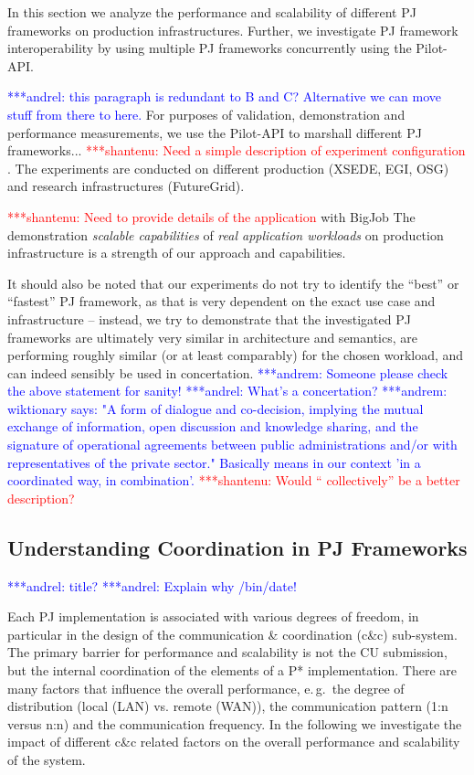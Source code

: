 \documentclass[conference,final]{IEEEtran}
\newcommand{\jhanote}[1]{ {\textcolor{red} { ***shantenu: #1 }}}
\newcommand{\alnote}[1]{ {\textcolor{blue} { ***andrel: #1 }}}
\newcommand{\amnote}[1]{ {\textcolor{blue} { ***andrem: #1 }}}
\newcommand{\alnote}[1]{}
\newcommand{\amnote}[1]{}
\newcommand{\jhanote}[1]{}
\newcommand{\cu}{CU\xspace}
\newcommand{\upp}{\vspace*{-0.5em}}
\begin{document}
In this section we analyze the performance and scalability of
different PJ frameworks on production infrastructures.  Further, we
investigate PJ framework interoperability by using multiple PJ
frameworks concurrently using the Pilot-API.  

\alnote{this paragraph is redundant to B and C? Alternative we can move
stuff from there to here.}
For purposes of validation, demonstration and performance
measurements, we use the Pilot-API to marshall different PJ
frameworks...\jhanote{Need a simple description of experiment
  configuration}.  The experiments are conducted on different
production (XSEDE, EGI, OSG) and research infrastructures
(FutureGrid).

\jhanote{Need to provide details of the application} with BigJob The
demonstration {\it scalable capabilities} of {\it real application
  workloads} on production infrastructure is a strength of our
approach and capabilities.


It should also be noted that our experiments do not try to identify
the ``best'' or ``fastest'' PJ framework, as that is very dependent on
the exact use case and infrastructure -- instead, we try to
demonstrate that the investigated PJ frameworks are ultimately very
similar in architecture and semantics, are performing roughly similar
(or at least comparably) for the chosen workload, and can indeed
sensibly be used in concertation.  \amnote{Someone please check the
  above statement for sanity!} \alnote{What's a concertation?}
\amnote{wiktionary says: "A form of dialogue and co-decision, implying
  the mutual exchange of information, open discussion and knowledge
  sharing, and the signature of operational agreements between public
  administrations and/or with representatives of the private sector."
  Basically means in our context 'in a coordinated way, in
  combination'.}\jhanote{Would `` collectively'' be a better
  description?}

\subsection{Understanding Coordination in PJ Frameworks\upp\upp}
\label{sec:pj_performance}
\alnote{title?}
\alnote{Explain why /bin/date!}

Each PJ implementation is associated with various degrees of freedom,
in particular in the design of the communication \& coordination
(c\&c) sub-system.  The primary barrier for performance and
scalability is not the \cu  submission, but the internal coordination of
the elements of a P* implementation. There are many factors that
influence the overall performance, e.\,g.\ the degree of distribution
(local (LAN) vs. remote (WAN)), the communication pattern (1:n versus
n:n) and the communication frequency. In the following we investigate
the impact of different c\&c related factors on the overall
performance and scalability of the system.
\end{document}
